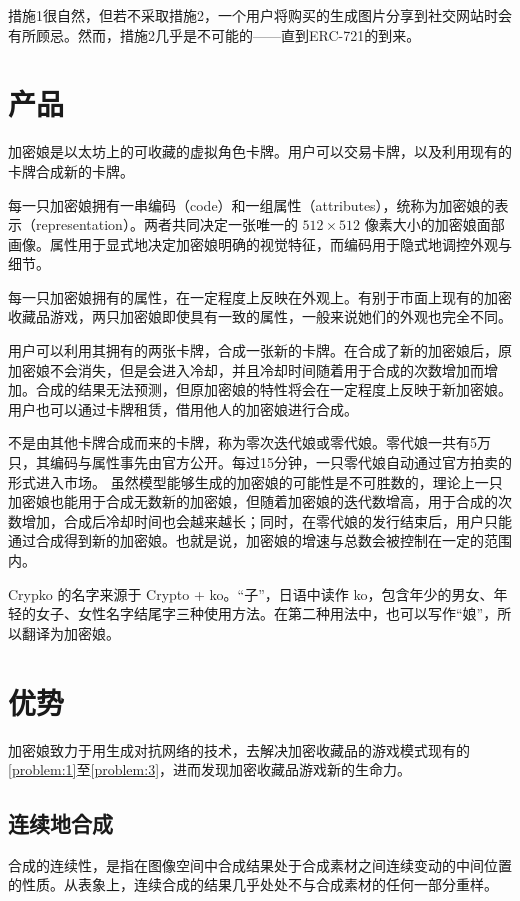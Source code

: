 \documentclass[a4paper]{article}
\begin{document}
措施1很自然，但若不采取措施2，一个用户将购买的生成图片分享到社交网站时会有所顾忌。然而，措施2几乎是不可能的——直到ERC-721的到来。

\newpage

\section{产品}

加密娘是以太坊上的可收藏的虚拟角色卡牌。用户可以交易卡牌，以及利用现有的卡牌合成新的卡牌。

每一只加密娘拥有一串编码（code）和一组属性（attributes），统称为加密娘的表示（representation）。两者共同决定一张唯一的 $512 \times 512$ 像素大小的加密娘面部画像。属性用于显式地决定加密娘明确的视觉特征，而编码用于隐式地调控外观与细节。

每一只加密娘拥有的属性，在一定程度上反映在外观上。有别于市面上现有的加密收藏品游戏，两只加密娘即使具有一致的属性，一般来说她们的外观也完全不同。

用户可以利用其拥有的两张卡牌，合成一张新的卡牌。在合成了新的加密娘后，原加密娘不会消失，但是会进入冷却，并且冷却时间随着用于合成的次数增加而增加。合成的结果无法预测，但原加密娘的特性将会在一定程度上反映于新加密娘。用户也可以通过卡牌租赁，借用他人的加密娘进行合成。

不是由其他卡牌合成而来的卡牌，称为零次迭代娘或零代娘。零代娘一共有5万只，其编码与属性事先由官方公开。每过15分钟，一只零代娘自动通过官方拍卖的形式进入市场。
虽然模型能够生成的加密娘的可能性是不可胜数的，理论上一只加密娘也能用于合成无数新的加密娘，但随着加密娘的迭代数增高，用于合成的次数增加，合成后冷却时间也会越来越长；同时，在零代娘的发行结束后，用户只能通过合成得到新的加密娘。也就是说，加密娘的增速与总数会被控制在一定的范围内。

Crypko 的名字来源于 Crypto + ko。“子”，日语中读作 ko，包含年少的男女、年轻的女子、女性名字结尾字三种使用方法。在第二种用法中，也可以写作“娘”，所以翻译为加密娘。

\section{优势}
加密娘致力于用生成对抗网络的技术，去解决加密收藏品的游戏模式现有的\ref{problem:1}至\ref{problem:3}，进而发现加密收藏品游戏新的生命力。

\subsection{连续地合成}

合成的连续性，是指在图像空间中合成结果处于合成素材之间连续变动的中间位置的性质。从表象上，连续合成的结果几乎处处不与合成素材的任何一部分重样。
\end{document}
